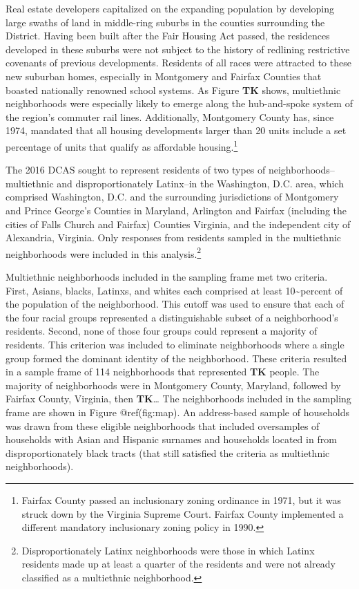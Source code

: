 \documentclass{baderart}
\begin{document}
Real estate developers capitalized on the expanding population by
developing large swaths of land in middle-ring suburbs in the counties
surrounding the District. Having been built after the Fair Housing Act
passed, the residences developed in these suburbs were not subject to
the history of redlining restrictive covenants of previous developments.
Residents of all races were attracted to these new suburban homes,
especially in Montgomery and Fairfax Counties that boasted nationally
renowned school systems. As Figure \textbf{TK} shows, multiethnic
neighborhoods were especially likely to emerge along the hub-and-spoke
system of the region's commuter rail lines. Additionally, Montgomery
County has, since 1974, mandated that all housing developments larger
than 20 units include a set percentage of units that qualify as
affordable housing.\footnote{Fairfax County passed an inclusionary
  zoning ordinance in 1971, but it was struck down by the Virginia
  Supreme Court. Fairfax County implemented a different mandatory
  inclusionary zoning policy in 1990.}

The 2016 DCAS sought to represent residents of two types of
neighborhoods--multiethnic and disproportionately Latinx--in the
Washington, D.C. area, which comprised Washington, D.C. and the
surrounding jurisdictions of Montgomery and Prince George's Counties in
Maryland, Arlington and Fairfax (including the cities of Falls Church
and Fairfax) Counties Virginia, and the independent city of Alexandria,
Virginia. Only responses from residents sampled in the multiethnic
neighborhoods were included in this analysis.\footnote{Disproportionately
  Latinx neighborhoods were those in which Latinx residents made up at
  least a quarter of the residents and were not already classified as a
  multiethnic neighborhood.}

Multiethnic neighborhoods included in the sampling frame met two
criteria. First, Asians, blacks, Latinxs, and whites each comprised at
least 10\textasciitilde{}percent of the population of the neighborhood.
This cutoff was used to ensure that each of the four racial groups
represented a distinguishable subset of a neighborhood's residents.
Second, none of those four groups could represent a majority of
residents. This criterion was included to eliminate neighborhoods where
a single group formed the dominant identity of the neighborhood. These
criteria resulted in a sample frame of 114 neighborhoods that
represented \textbf{TK} people. The majority of neighborhoods were in
Montgomery County, Maryland, followed by Fairfax County, Virginia, then
\textbf{TK}\ldots{} The neighborhoods included in the sampling frame are
shown in Figure @ref(fig:map). An address-based sample of households was
drawn from these eligible neighborhoods that included oversamples of
households with Asian and Hispanic surnames and households located in
from disproportionately black tracts (that still satisfied the criteria
as multiethnic neighborhoods).
\end{document}
